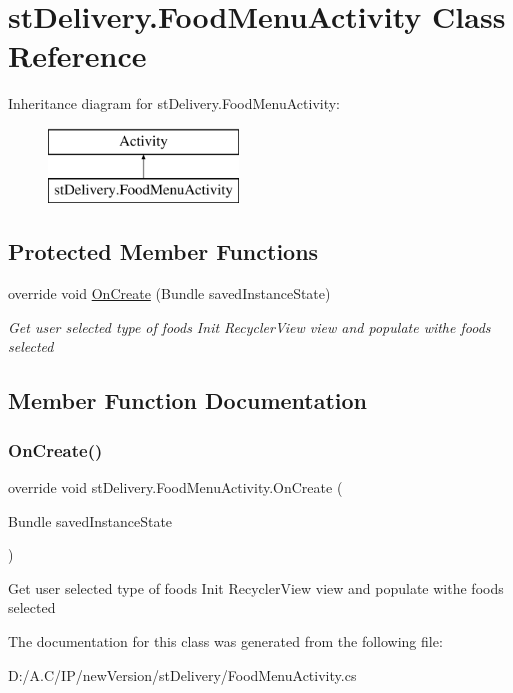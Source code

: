 \hypertarget{classst_delivery_1_1_food_menu_activity}{}\section{st\+Delivery.\+Food\+Menu\+Activity Class Reference}
\label{classst_delivery_1_1_food_menu_activity}
Inheritance diagram for st\+Delivery.\+Food\+Menu\+Activity\+:\begin{figure}[H]
\begin{center}
\leavevmode
\includegraphics[height=2.000000cm]{classst_delivery_1_1_food_menu_activity}
\end{center}
\end{figure}
\subsection*{Protected Member Functions}
\begin{DoxyCompactItemize}
\item 
override void \hyperlink{classst_delivery_1_1_food_menu_activity_acb57ca9c271c31bfa67f7c86a624f193}{On\+Create} (Bundle saved\+Instance\+State)
\begin{DoxyCompactList}\small\item\em Get user selected type of foods Init Recycler\+View view and populate withe foods selected \end{DoxyCompactList}\end{DoxyCompactItemize}


\subsection{Member Function Documentation}
\mbox{\label{classst_delivery_1_1_food_menu_activity_acb57ca9c271c31bfa67f7c86a624f193}} 
\subsubsection{\texorpdfstring{On\+Create()}{OnCreate()}}
{\footnotesize\ttfamily override void st\+Delivery.\+Food\+Menu\+Activity.\+On\+Create (\begin{DoxyParamCaption}\item[{Bundle}]{saved\+Instance\+State }\end{DoxyParamCaption})\hspace{0.3cm}{\ttfamily [protected]}}



Get user selected type of foods Init Recycler\+View view and populate withe foods selected 



The documentation for this class was generated from the following file\+:\begin{DoxyCompactItemize}
\item 
D\+:/\+A.\+C/\+I\+P/new\+Version/st\+Delivery/Food\+Menu\+Activity.\+cs\end{DoxyCompactItemize}

